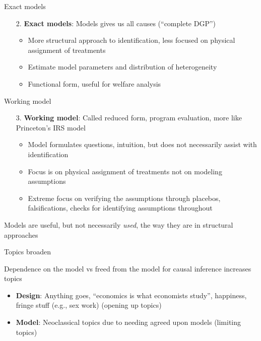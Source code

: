 \documentclass{beamer}
\begin{document}
\begin{frame}{Exact models}

  \begin{enumerate}
    \item[2. ] \textbf{Exact models}: Models gives us all causes (``complete DGP'')
          \begin{itemize}
            \item More structural approach to identification, less focused on physical assignment of treatments
            \item Estimate model parameters and distribution of heterogeneity
            \item Functional form, useful for welfare analysis
          \end{itemize}
  \end{enumerate}

\end{frame}

\begin{frame}{Working model}

  \begin{enumerate}
    \item[3. ] \textbf{Working model}: Called reduced form, program evaluation, more like Princeton's IRS model
          \begin{itemize}
            \item Model formulates questions, intuition, but does not necessarily assist with identification
            \item Focus is on physical assignment of treatments not on modeling assumptions
            \item Extreme focus on verifying the assumptions through placebos, falsifications, checks for identifying assumptions throughout
          \end{itemize}
  \end{enumerate}

  \bigskip

Models are useful, but not necessarily \emph{used}, the way they are in structural approaches

\end{frame}


\begin{frame}{Topics broaden}

  Dependence on the model vs freed from the model for causal inference increases topics
  \begin{itemize}
    \item \textbf{Design}: Anything goes, ``economics is what economists study'', happiness, fringe stuff (e.g., sex work) (opening up topics)
    \item \textbf{Model}: Neoclassical topics due to needing agreed upon models (limiting topics)
  \end{itemize}

\end{frame}
\end{document}
